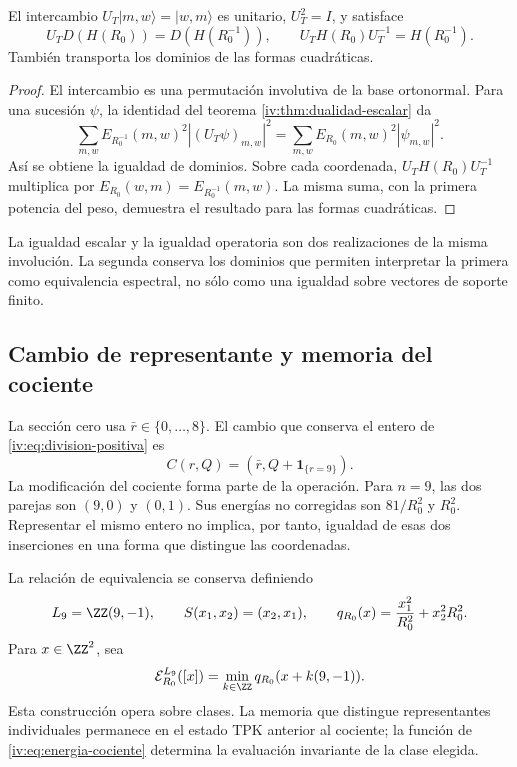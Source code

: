 \begin{theorem}
\label{iv:thm:t-unitaria}
El intercambio
\(U_T|m,w\rangle=|w,m\rangle\) es unitario,
\(U_T^2=I\), y satisface
\begin{equation}
 U_TD(H(R_0))=D(H(R_0^{-1})),
 \qquad U_TH(R_0)U_T^{-1}=H(R_0^{-1}).
 \label{iv:eq:conjugacion-h}
\end{equation}
También transporta los dominios de las formas cuadráticas.
\end{theorem}
\begin{proof}
El intercambio es una permutación involutiva de la base
ortonormal. Para una sucesión \(\psi\), la identidad del
teorema \ref{iv:thm:dualidad-escalar} da
\[
 \sum_{m,w}E_{R_0^{-1}}(m,w)^2|(U_T\psi)_{m,w}|^2
 =\sum_{m,w}E_{R_0}(m,w)^2|\psi_{m,w}|^2.
\]
Así se obtiene la igualdad de dominios. Sobre cada coordenada,
\(U_TH(R_0)U_T^{-1}\) multiplica por
\(E_{R_0}(w,m)=E_{R_0^{-1}}(m,w)\). La misma suma, con
la primera potencia del peso, demuestra el resultado para las
formas cuadráticas.
\end{proof}

La igualdad escalar y la igualdad operatoria son dos realizaciones
de la misma involución. La segunda conserva los dominios que
permiten interpretar la primera como equivalencia espectral,
no sólo como una igualdad sobre vectores de soporte finito.

\subsection{Cambio de representante y memoria del cociente}

La sección cero usa \(\bar r\in\{0,\ldots,8\}\). El cambio
que conserva el entero de \eqref{iv:eq:division-positiva} es
\begin{equation}
 C(r,Q)=(\bar r,Q+\mathbf1_{\{r=9\}}).
 \label{iv:eq:cambio-seccion}
\end{equation}
La modificación del cociente forma parte de la operación.
Para \(n=9\), las dos parejas son \((9,0)\) y \((0,1)\).
Sus energías no corregidas son \(81/R_0^2\) y \(R_0^2\).
Representar el mismo entero no implica, por tanto, igualdad de
esas dos inserciones en una forma que distingue las coordenadas.

La relación de equivalencia se conserva definiendo
\[
 L_9=\ZZ(9,-1),\qquad S(x_1,x_2)=(x_2,x_1),
 \qquad q_{R_0}(x)=\frac{x_1^2}{R_0^2}+x_2^2R_0^2.
\]
Para \(x\in\ZZ^2\), sea
\begin{equation}
 \mathcal E_{R_0}^{L_9}([x])
 =\min_{k\in\ZZ}q_{R_0}(x+k(9,-1)).
 \label{iv:eq:energia-cociente}
\end{equation}
Esta construcción opera sobre clases. La memoria que distingue
representantes individuales permanece en el estado TPK anterior
al cociente; la función de \eqref{iv:eq:energia-cociente}
determina la evaluación invariante de la clase elegida.

